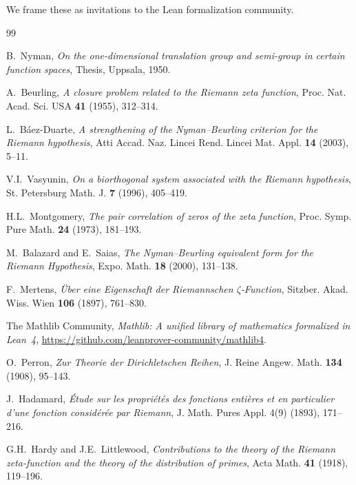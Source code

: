 \documentclass[11pt,a4paper]{article}
\begin{document}
We frame these as invitations to the Lean formalization community.

\begin{thebibliography}{99}

B.~Nyman, \emph{On the one-dimensional translation group and semi-group in
certain function spaces}, Thesis, Uppsala, 1950.

A.~Beurling, \emph{A closure problem related to the Riemann zeta function},
Proc. Nat. Acad. Sci. USA \textbf{41} (1955), 312--314.

L.~B\'aez-Duarte, \emph{A strengthening of the Nyman--Beurling criterion for
the Riemann hypothesis}, Atti Accad. Naz. Lincei Rend. Lincei Mat. Appl.
\textbf{14} (2003), 5--11.

V.I.~Vasyunin, \emph{On a biorthogonal system associated with the Riemann
hypothesis}, St. Petersburg Math. J. \textbf{7} (1996), 405--419.

H.L.~Montgomery, \emph{The pair correlation of zeros of the zeta function},
Proc. Symp. Pure Math. \textbf{24} (1973), 181--193.

M.~Balazard and E.~Saias, \emph{The Nyman--Beurling equivalent form for the
Riemann Hypothesis}, Expo. Math. \textbf{18} (2000), 131--138.

F.~Mertens, \emph{\"Uber eine Eigenschaft der Riemannschen $\zeta$-Function},
Sitzber. Akad. Wiss. Wien \textbf{106} (1897), 761--830.

The Mathlib Community, \emph{Mathlib: A unified library of mathematics
formalized in Lean~4}, \url{https://github.com/leanprover-community/mathlib4}.

O.~Perron, \emph{Zur Theorie der Dirichletschen Reihen},
J. Reine Angew. Math. \textbf{134} (1908), 95--143.

J.~Hadamard, \emph{\'Etude sur les propri\'et\'es des fonctions enti\`eres
et en particulier d'une fonction consid\'er\'ee par Riemann},
J. Math. Pures Appl. 4(9) (1893), 171--216.

G.H.~Hardy and J.E.~Littlewood, \emph{Contributions to the theory of the
Riemann zeta-function and the theory of the distribution of primes},
Acta Math. \textbf{41} (1918), 119--196.


\end{thebibliography}
\end{document}
